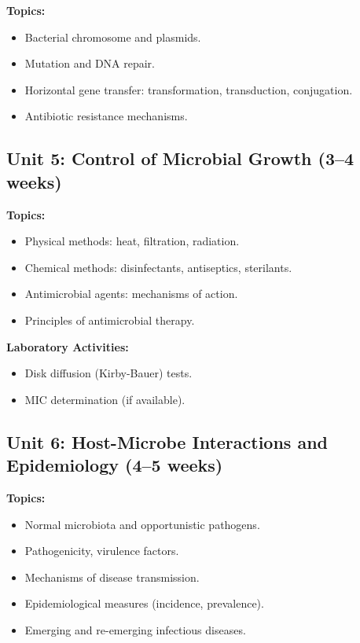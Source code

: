 \documentclass[12pt,oneside]{book}
\begin{document}
\textbf{Topics:}
\begin{itemize}
    \item Bacterial chromosome and plasmids.
    \item Mutation and DNA repair.
    \item Horizontal gene transfer: transformation, transduction, conjugation.
    \item Antibiotic resistance mechanisms.
\end{itemize}

\subsection{Unit 5: Control of Microbial Growth (3--4 weeks)}

\textbf{Topics:}
\begin{itemize}
    \item Physical methods: heat, filtration, radiation.
    \item Chemical methods: disinfectants, antiseptics, sterilants.
    \item Antimicrobial agents: mechanisms of action.
    \item Principles of antimicrobial therapy.
\end{itemize}

\textbf{Laboratory Activities:}
\begin{itemize}
    \item Disk diffusion (Kirby-Bauer) tests.
    \item MIC determination (if available).
\end{itemize}

\subsection{Unit 6: Host-Microbe Interactions and Epidemiology (4--5 weeks)}

\textbf{Topics:}
\begin{itemize}
    \item Normal microbiota and opportunistic pathogens.
    \item Pathogenicity, virulence factors.
    \item Mechanisms of disease transmission.
    \item Epidemiological measures (incidence, prevalence).
    \item Emerging and re-emerging infectious diseases.
\end{itemize}
\end{document}
